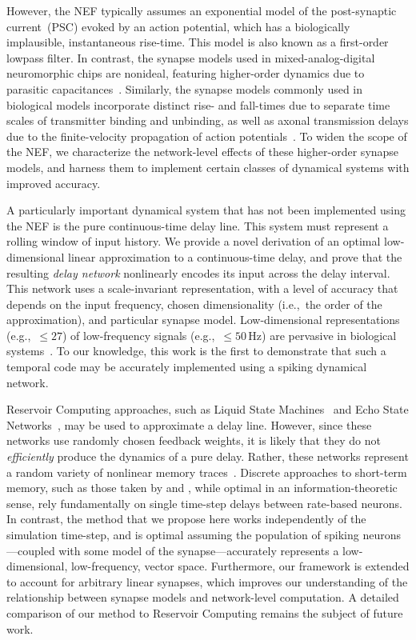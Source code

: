 However, the NEF typically assumes an exponential model of the post-synaptic current~(PSC) evoked by an action potential, which has a biologically implausible, instantaneous rise-time.
This model is also known as a first-order lowpass filter.
In contrast, the synapse models used in mixed-analog-digital neuromorphic chips are nonideal, featuring higher-order dynamics due to parasitic capacitances~\citep{voelker2017iscas}.
Similarly, the synapse models commonly used in biological models incorporate distinct rise- and fall-times due to separate time scales of transmitter binding and unbinding, as well as axonal transmission delays due to the finite-velocity propagation of action potentials~\citep{roth2009modeling}.
To widen the scope of the NEF, we characterize the network-level effects of these higher-order synapse models, and harness them to implement certain classes of dynamical systems with improved accuracy.

A particularly important dynamical system that has not been implemented using the NEF is the pure continuous-time delay line.
This system must represent a rolling window of input history.
We provide a novel derivation of an optimal low-dimensional linear approximation to a continuous-time delay, and prove that the resulting \emph{delay network} nonlinearly encodes its input across the delay interval.
This network uses a scale-invariant representation, with a level of accuracy that depends on the input frequency, chosen dimensionality (i.e.,~the order of the approximation), and particular synapse model.
Low-dimensional representations (e.g.,~$\le 27$) of low-frequency signals (e.g.,~$\le 50$\,Hz) are pervasive in biological systems~\citep{cunningham2014dimensionality, waernberg2017low, pulvermuller1997high, singer1999neuronal}.
To our knowledge, this work is the first to demonstrate that such a temporal code may be accurately implemented using a spiking dynamical network.

Reservoir Computing approaches, such as Liquid State Machines~\citep{maass2002real} and Echo State Networks~\citep{jaeger2001echo}, may be used to approximate a delay line.
However, since these networks use randomly chosen feedback weights, it is likely that they do not {\it efficiently} produce the dynamics of a pure delay.
Rather, these networks represent a random variety of nonlinear memory traces~\citep{lukovsevicius2012reservoir}.
Discrete approaches to short-term memory, such as those taken by \citet{white2004short} and \citet{ganguli2008memory}, while optimal in an information-theoretic sense, rely fundamentally on single time-step delays between rate-based neurons.
In contrast, the method that we propose here works independently of the simulation time-step, and is optimal assuming the population of spiking neurons---coupled with some model of the synapse---accurately represents a low-dimensional, low-frequency, vector space.
Furthermore, our framework is extended to account for arbitrary linear synapses, which improves our understanding of the relationship between synapse models and network-level computation.
A detailed comparison of our method to Reservoir Computing remains the subject of future work.

